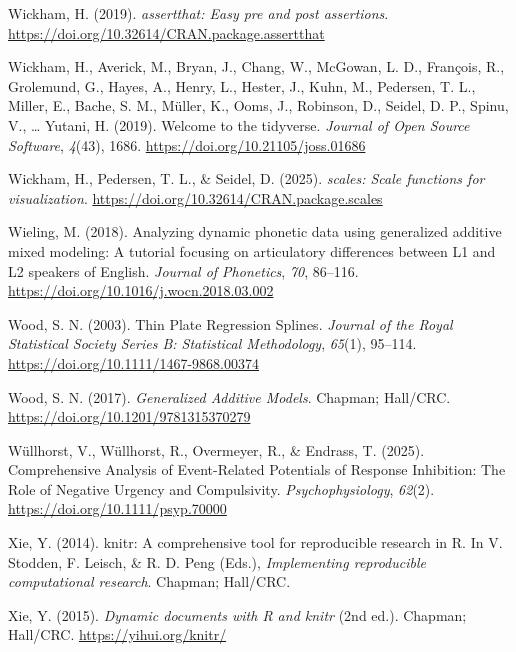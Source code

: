 \documentclass[
  doc,
  floatsintext,
  longtable,
  a4paper,
  nolmodern,
  notxfonts,
  notimes,
  colorlinks=true,linkcolor=blue,citecolor=blue,urlcolor=blue]{apa7}
\newlength{\cslhangindent}
\newenvironment{CSLReferences}[2] %
 {\begin{list}{}{%
  \setlength{\itemindent}{0pt}
  \setlength{\leftmargin}{0pt}
  \setlength{\parsep}{0pt}
  \ifodd #1
   \setlength{\leftmargin}{\cslhangindent}
   \setlength{\itemindent}{-1\cslhangindent}
  \fi
  \setlength{\itemsep}{#2\baselineskip}}}
 {\end{list}}
\begin{document}
\begin{CSLReferences}{1}{0}
Wickham, H. (2019). \emph{{assertthat}: Easy pre and post assertions}.
\url{https://doi.org/10.32614/CRAN.package.assertthat}

Wickham, H., Averick, M., Bryan, J., Chang, W., McGowan, L. D.,
François, R., Grolemund, G., Hayes, A., Henry, L., Hester, J., Kuhn, M.,
Pedersen, T. L., Miller, E., Bache, S. M., Müller, K., Ooms, J.,
Robinson, D., Seidel, D. P., Spinu, V., \ldots{} Yutani, H. (2019).
Welcome to the {tidyverse}. \emph{Journal of Open Source Software},
\emph{4}(43), 1686. \url{https://doi.org/10.21105/joss.01686}

Wickham, H., Pedersen, T. L., \& Seidel, D. (2025). \emph{{scales}:
Scale functions for visualization}.
\url{https://doi.org/10.32614/CRAN.package.scales}

Wieling, M. (2018). Analyzing dynamic phonetic data using generalized
additive mixed modeling: A tutorial focusing on articulatory differences
between L1 and L2 speakers of English. \emph{Journal of Phonetics},
\emph{70}, 86--116. \url{https://doi.org/10.1016/j.wocn.2018.03.002}

Wood, S. N. (2003). Thin Plate Regression Splines. \emph{Journal of the
Royal Statistical Society Series B: Statistical Methodology},
\emph{65}(1), 95--114. \url{https://doi.org/10.1111/1467-9868.00374}

Wood, S. N. (2017). \emph{Generalized Additive Models}. Chapman;
Hall/CRC. \url{https://doi.org/10.1201/9781315370279}

Wüllhorst, V., Wüllhorst, R., Overmeyer, R., \& Endrass, T. (2025).
Comprehensive Analysis of Event{-}Related Potentials of Response
Inhibition: The Role of Negative Urgency and Compulsivity.
\emph{Psychophysiology}, \emph{62}(2).
\url{https://doi.org/10.1111/psyp.70000}

Xie, Y. (2014). {knitr}: A comprehensive tool for reproducible research
in {R}. In V. Stodden, F. Leisch, \& R. D. Peng (Eds.),
\emph{Implementing reproducible computational research}. Chapman;
Hall/CRC.

Xie, Y. (2015). \emph{Dynamic documents with {R} and knitr} (2nd ed.).
Chapman; Hall/CRC. \url{https://yihui.org/knitr/}


\end{CSLReferences}
\end{document}

